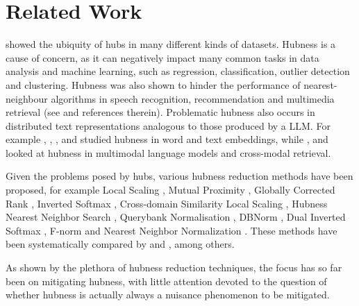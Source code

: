 \section{Related Work}
\citet{radovanovic2010hubs} showed the ubiquity of hubs in many different kinds of datasets. 
Hubness is a cause of concern, as it can negatively impact many common tasks in data analysis and machine learning, such as regression, classification, outlier detection and clustering. Hubness was also shown to hinder the performance of nearest-neighbour algorithms in speech recognition, recommendation and multimedia retrieval (see \citet{feldbauer2019comprehensive} and references therein). Problematic hubness also occurs in distributed text representations analogous to those produced by a LLM. For example \citet{Dinu2014ImprovingZL}, \citet{smith2017offline}, \citet{lample2018word}, \citet{huang2020improving} and \citet{pmlr-v233-nielsen24a} studied hubness in word and text embeddings, while \citet{bogolin2022cross}, \citet{wang-etal-2023-balance} and \citet{chowdhury-etal-2024-nearest} looked at hubness in multimodal language models and cross-modal retrieval. 

Given the problems posed by hubs, various hubness reduction methods have been proposed, for example Local Scaling \citep{zelnik2004self}, Mutual Proximity \citep{schnitzer2012local}, Globally Corrected Rank \citep{Dinu2014ImprovingZL}, Inverted Softmax \citep{smith2017offline}, Cross-domain Similarity Local Scaling \citep{lample2018word}, Hubness Nearest Neighbor Search \citep{huang2020improving}, Querybank Normalisation \citep{bogolin2022cross}, DBNorm \citep{wang-etal-2023-balance}, Dual Inverted Softmax \citep{wang-etal-2023-balance}, F-norm \citep{pmlr-v233-nielsen24a} and Nearest Neighbor Normalization \citep{chowdhury-etal-2024-nearest}. These methods have been systematically compared by \citet{feldbauer2019comprehensive} and \citet{pmlr-v233-nielsen24a}, among others. 

As shown by the plethora of hubness reduction techniques, the focus has so far been on mitigating hubness, with little attention devoted to the question of whether hubness is actually always a nuisance phenomenon to be mitigated.